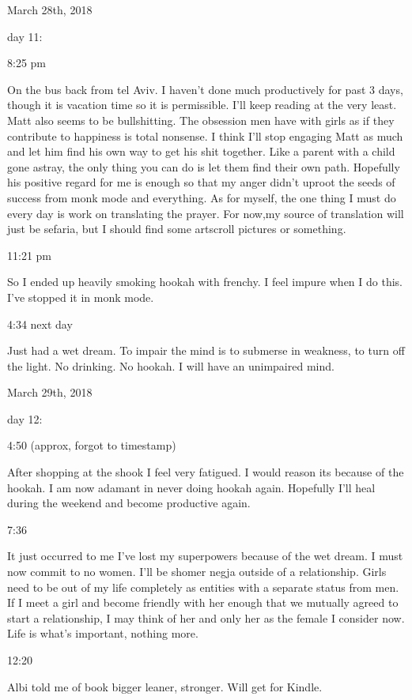\bigskip
\bigskip
March 28th, 2018

day 11:

8:25 pm

On the bus back from tel Aviv. I haven't done much productively for past
3 days, though it is vacation time so it is permissible. I'll keep
reading at the very least. Matt also seems to be bullshitting. The
obsession men have with girls as if they contribute to happiness is
total nonsense. I think I'll stop engaging Matt as much and let him find
his own way to get his shit together. Like a parent with a child gone
astray, the only thing you can do is let them find their own path.
Hopefully his positive regard for me is enough so that my anger didn't
uproot the seeds of success from monk mode and everything. As for
myself, the one thing I must do every day is work on translating the
prayer. For now,my source of translation will just be sefaria, but I
should find some artscroll pictures or something.

11:21 pm

So I ended up heavily smoking hookah with frenchy. I feel impure when I
do this. I've stopped it in monk mode.

4:34 next day

Just had a wet dream. To impair the mind is to submerse in weakness, to
turn off the light. No drinking. No hookah. I will have an unimpaired
mind.

\bigskip
\bigskip
March 29th, 2018

day 12:

4:50 (approx, forgot to timestamp)

After shopping at the shook I feel very fatigued. I would reason its
because of the hookah. I am now adamant in never doing hookah again.
Hopefully I'll heal during the weekend and become productive again.

7:36

It just occurred to me I've lost my superpowers because of the wet
dream. I must now commit to no women. I'll be shomer negja outside of a
relationship. Girls need to be out of my life completely as entities
with a separate status from men. If I meet a girl and become friendly
with her enough that we mutually agreed to start a relationship, I may
think of her and only her as the female I consider now. Life is what's
important, nothing more.

12:20

Albi told me of book bigger leaner, stronger. Will get for Kindle.

